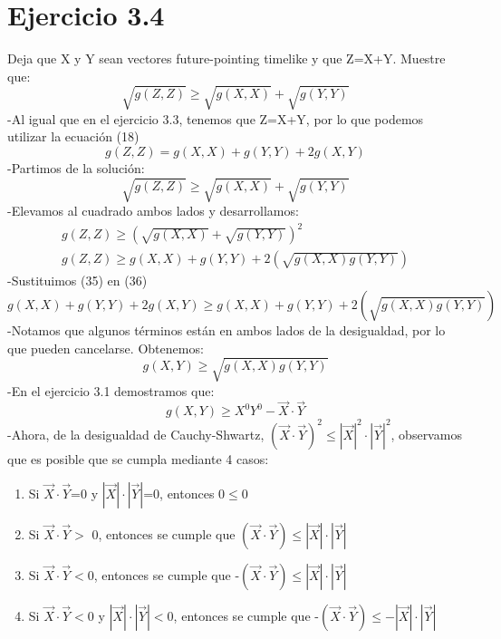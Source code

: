 \documentclass[a4paper, 11pt]{article}
\begin{document}
\newpage
\section*{Ejercicio 3.4}
Deja que X y Y sean vectores  future-pointing timelike y que Z=X+Y. Muestre que:
\begin{equation*}
    \sqrt{g(Z,Z)}\geq\sqrt{g(X,X)}+\sqrt{g(Y,Y)}
\end{equation*}
-Al igual que en el ejercicio 3.3, tenemos que Z=X+Y, por lo que podemos utilizar la ecuación (18)
\begin{equation}
     g(Z,Z)=g(X,X)+g(Y,Y) +2g(X,Y)
\end{equation}
-Partimos de la solución:
\begin{equation*}
    \sqrt{g(Z,Z)}\geq\sqrt{g(X,X)}+\sqrt{g(Y,Y)}
\end{equation*}
-Elevamos al cuadrado ambos lados y desarrollamos:
\begin{eqnarray}
\nonumber {g(Z,Z)}\geq(\sqrt{g(X,X)}+\sqrt{g(Y,Y)})^2\\
{g(Z,Z)}\geq g(X,X)+g(Y,Y)+2(\sqrt{g(X,X)g(Y,Y)})
\end{eqnarray}
-Sustituimos (35) en (36)
\begin{equation}
 g(X,X)+g(Y,Y) +2g(X,Y)\geq g(X,X)+g(Y,Y)+2(\sqrt{g(X,X)g(Y,Y)})
\end{equation}
-Notamos que algunos términos están en ambos lados de la desigualdad, por lo que pueden cancelarse. Obtenemos:
\begin{equation}
 g(X,Y)\geq \sqrt{g(X,X)g(Y,Y)}
\end{equation}
-En el ejercicio 3.1 demostramos que:
\begin{equation}
    g(X,Y)\geq X^{0}Y^{0} - \vec{X}\cdot\vec{Y}
\end{equation}
-Ahora, de la desigualdad de Cauchy-Shwartz, $(\vec{X}\cdot\vec{Y})^2 \leq|\vec{X}|^2 \cdot |\vec{Y}|^2$, observamos que es posible que se cumpla mediante 4 casos:
\begin{enumerate}
    \item Si $\vec{X}\cdot\vec{Y}$=0 y $|\vec{X}| \cdot |\vec{Y}|$=0, entonces 0$\leq$0
    \item Si $\vec{X}\cdot\vec{Y}>$ 0, entonces se cumple que $(\vec{X}\cdot\vec{Y}) \leq|\vec{X}| \cdot |\vec{Y}|$
    \item Si $\vec{X}\cdot\vec{Y}<$0, entonces se cumple que -$(\vec{X}\cdot\vec{Y}) \leq|\vec{X}| \cdot |\vec{Y}|$
    \item Si $\vec{X}\cdot\vec{Y}<$0 y $|\vec{X}| \cdot |\vec{Y}|<$0, entonces se cumple que -$(\vec{X}\cdot\vec{Y}) \leq-|\vec{X}| \cdot |\vec{Y}|$
\end{enumerate}
\end{document}
